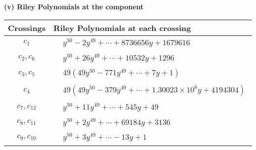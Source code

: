 \documentclass[1p]{elsarticle_modified}
\theoremstyle{definition}
\begin{document}
\flushleft \textbf{(v) Riley Polynomials at the component}\newline \\
\begin{tabular}{m{50pt}|m{274pt}}
Crossings & \hspace{64pt}Riley Polynomials at each crossing \\
\hline $$\begin{aligned}c_{1}\end{aligned}$$&$\begin{aligned}
&y^{50}-2 y^{49}+\cdots+8736656 y+1679616
\end{aligned}$\\
\hline $$\begin{aligned}c_{2},c_{6}\end{aligned}$$&$\begin{aligned}
&y^{50}+26 y^{49}+\cdots+10532 y+1296
\end{aligned}$\\
\hline $$\begin{aligned}c_{3},c_{5}\end{aligned}$$&$\begin{aligned}
&49(49 y^{50}-771 y^{49}+\cdots+7 y+1)
\end{aligned}$\\
\hline $$\begin{aligned}c_{4}\end{aligned}$$&$\begin{aligned}
&49(49 y^{50}-379 y^{49}+\cdots+1.30023\times10^{8} y+4194304)
\end{aligned}$\\
\hline $$\begin{aligned}c_{7},c_{12}\end{aligned}$$&$\begin{aligned}
&y^{50}+11 y^{49}+\cdots+545 y+49
\end{aligned}$\\
\hline $$\begin{aligned}c_{8},c_{11}\end{aligned}$$&$\begin{aligned}
&y^{50}+2 y^{49}+\cdots+69184 y+3136
\end{aligned}$\\
\hline $$\begin{aligned}c_{9},c_{10}\end{aligned}$$&$\begin{aligned}
&y^{50}+3 y^{49}+\cdots-13 y+1
\end{aligned}$\\
\hline
\end{tabular}\\~\\
\end{document}
